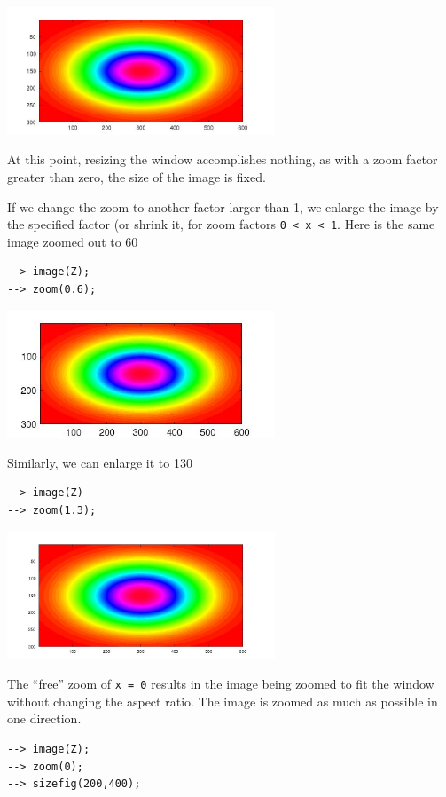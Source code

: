 \centerline{\includegraphics[width=8cm]{zoom1}}


At this point, resizing the window accomplishes nothing, as with a zoom factor 
greater than zero, the size of the image is fixed.

If we change the zoom to another factor larger than 1, we enlarge the image by
the specified factor (or shrink it, for zoom factors \verb|0 < x < 1|.  Here is the
same image zoomed out to 60%
\begin{verbatim}
--> image(Z);
--> zoom(0.6);
\end{verbatim}


\centerline{\includegraphics[width=8cm]{zoom3}}


Similarly, we can enlarge it to 130%
\begin{verbatim}
--> image(Z)
--> zoom(1.3);
\end{verbatim}


\centerline{\includegraphics[width=8cm]{zoom4}}


The ``free'' zoom of \verb|x = 0| results in the image being zoomed to fit the window
without changing the aspect ratio.  The image is zoomed as much as possible in
one direction.
\begin{verbatim}
--> image(Z);
--> zoom(0);
--> sizefig(200,400);
\end{verbatim}


